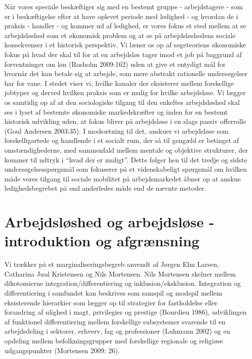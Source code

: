 Når vores speciale beskæftiger sig med en bestemt gruppe - arbejdstagere - som er i beskæftigelse efter at have oplevet periode med ledighed - og hvordan de i praksis - handler - og kommer ud af ledighed, er vores fokus et sted mellem at se arbejdsløshed som et økonomisk problem og at se på arbejdsløshedens sociale konsekvenser i et historisk perspektiv. Vi læner os op af søgeteoriens økonomiske fokus på hvad der skal til for at en arbejdsløs tager imod et job på baggrund af forventninger om løn (Rosholm 2009:162) uden at give et entydigt mål for hvornår det kan betale sig at arbejde, som mere abstrakt rationelle undersøgelser har for vane. I stedet viser vi, hvilke kanaler der eksisterer mellem forskellige jobtyper og derved hvilken praksis som er mulig for hvilke arbejdsløse. Vi lægger os samtidig op af at den sociologiske tilgang til den enkeltes arbejdsløshed skal ses i lyset af bestemte økonomiske markedskræfter og inden for en bestemt historisk udvikling uden, at fokus bliver på arbejdsløse i en slags passiv offerrolle (Goul Andersen 2003:35). I modsætning til det, anskuer vi arbejdsløse som forskelligartede og handlende i et socialt rum, der så til gengæld er betinget af omstændighederne, med sammenfald mellem mentale og objektive strukturer, der kommer til udtryk i “hvad der er muligt”.
Dette følger hen til det tredje og sidste undersøgelsesspørgsmål som fokuserer på et videnskabeligt spørgsmål om hvilken måde vores tilgang til sociale mobilitet på arbejdsmarkedet åbner op at anskue ledighedsbegrebet på end anderledes måde end de nævnte metoder.




\section{Arbejdsløshed og arbejdsløse - introduktion og afgrænsning \label{}}

Vi trækker på et marginaliseringsbegreb anvendt af Jørgen Elm Larsen, Catharina Juul Kristensen og Nils Mortensen. Nils Mortensen skelner mellem dikotomierne integration/differentiering og inklusion/eksklusion. Integration og differentiering i samfundet kan beskrives som samspil og modspil mellem eksisterende hierarkier som lægger op til strategier for fastholdelse eller forandring af ulighed i magt, privilegier og prestige (Bourdieu 1986), udviklingen af funktionel differentiering mellem forskellige subsystemer svarende til en arbejdsdeling i sektorer, erhverv, fag og professioner (Luhmann 2002) og en opdeling mellem befolkningsgrupper med forskellige regionale og religiøse udgangspunkter (Mortensen 2009: 26).

